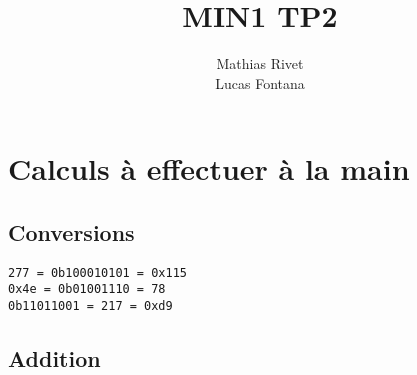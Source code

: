 \documentclass[french, 10pt, a4paper]{article}
\title{MIN1 TP2}
\author{
	Mathias Rivet\\
	Lucas Fontana
}
\begin{document}
	\maketitle



\section{Calculs à effectuer à la main}

\subsection{Conversions}

\texttt{277 = 0b100010101 = 0x115}	\\
\texttt{0x4e = 0b01001110 = 78}		\\
\texttt{0b11011001 = 217 = 0xd9}



\subsection{Addition}
\end{document}
